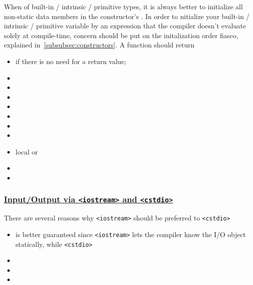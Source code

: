 When  of built-in / intrinsic / 
primitive types, it is always better to initialize all non-static data 
members in the constructor's .
\newline
In order to nitialize your built-in / intrinsic / primitive variable by 
an expression that the compiler doesn’t evaluate solely at compile-time, 
concern should be put on the initalization order fiasco, explained 
in~\ref{subsubsec:constructors}.
\newline
A function should return
\begin{itemize}
    \item {} if there is no need for a return value;
    \item {}
    \item {}
    \item {}
    \item {}
    \item {}
    \item {}
    \item {}
    \item local  or 
    \item {}
    \item
\end{itemize}

\subsubsection{\href{https://isocpp.org/wiki/faq/input-output}{Input/Output via \texttt{<iostream>} and \texttt{<cstdio>}}}
There are several reasons why \texttt{<iostream>} should be preferred to 
\texttt{<cstdio>}
\begin{itemize}
    \item {} is better guaranteed since \texttt{<iostream>} 
          lets the compiler know the I/O object statically, while \texttt{<cstdio>}
    \item {}
    \item {}
    \item {}
\end{itemize}

